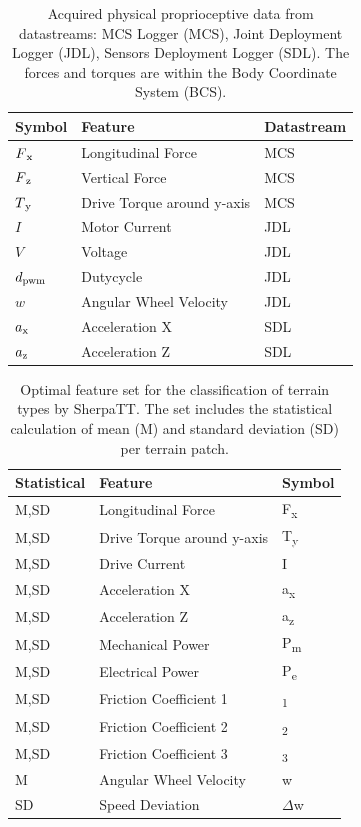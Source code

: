 \documentclass{article}
\begin{document}
\begin{table}[h!]
   \centering
    \caption{Acquired physical proprioceptive data from datastreams: MCS Logger (MCS), Joint Deployment Logger (JDL), Sensors Deployment Logger (SDL). The forces and torques are within the Body Coordinate System (BCS).\cite{Dimastrogiovanni2020}\label{fig:features1}}
    \begin{tabularx}{\columnwidth}{XXX}
    \textbf{Symbol}& \textbf{Feature} & \textbf{Datastream}  \\
    \hline
      $F\textsubscript{x}$ & Longitudinal Force	 &  MCS\\
      $F\textsubscript{z}$& Vertical Force	 &MCS \\ 
      $T\textsubscript{y}$& Drive Torque around y-axis	   &MCS\\ 
      $I $& Motor Current	  & JDL\\ 
      $V$ & Voltage 	   &JDL\\ 
      $d\textsubscript{pwm}$&  Dutycycle	   &JDL\\ 
      $w$& Angular Wheel Velocity 	 &JDL \\
      $a\textsubscript{x}$& Acceleration X	  &SDL\\ 
      $a\textsubscript{z}$&  Acceleration Z	   &SDL\\ 
    \end{tabularx}
\end{table}

\begin{table}[h!]
   \centering
    \caption{Optimal feature set for the classification of terrain types by SherpaTT. The set includes the statistical calculation of mean (M) and standard deviation (SD) per terrain patch.\label{fig:optiF}}
    \begin{tabularx}{\columnwidth}{XXX}
    \textbf{Statistical} & \textbf{Feature}  & \textbf{Symbol} \\
    \hline
     M,SD	&  Longitudinal Force	 & F\textsubscript{x} \\ 
     M,SD	&  Drive Torque	around y-axis  & T\textsubscript{y} \\ 
     M,SD	&  Drive Current	 & I \\  
     M,SD	&  Acceleration X	 &  a\textsubscript{x}\\ 
     M,SD	&  Acceleration Z	 & a\textsubscript{z} \\ 
     M,SD	&  Mechanical Power	 & P\textsubscript{m} \\ 
     M,SD	&  Electrical Power	 & P\textsubscript{e} \\ 
     M,SD	&  Friction Coefficient 1	 & \textmu \textsubscript{1} \\ 
     M,SD	&  Friction Coefficient 2 & \textmu \textsubscript{2}\\ 
     M,SD	&  Friction Coefficient 3	 & \textmu \textsubscript{3}\\ 
     M	    &  Angular Wheel Velocity	     &  w      \\ 
     SD    	&  Speed Deviation	 & $\Delta$w\\ 
    \end{tabularx}	
\end{table}
\end{document}
